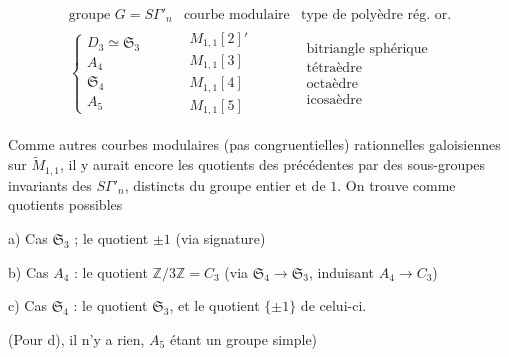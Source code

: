 \[
\begin{array}{lll}
\text{groupe }G=S\Gamma'_n & \text{courbe modulaire} & \text{type de polyèdre rég. or.}\\[.5em]
\left\{\begin{array}{l}D_3\simeq\mathfrak S_3\\ A_4\\ \mathfrak S_4\\ A_5\end{array}\right.
&\begin{array}{l}M_{1,1}[2]'\\M_{1,1}[3]\\M_{1,1}[4]\\M_{1,1}[5]\end{array}
&\begin{array}{l}\text{bitriangle sphérique}\\\text{tétraèdre}\\\text{octaèdre}\\\text{icosaèdre}\end{array}
\end{array}
\tag{75}
\]

Comme autres courbes modulaires (pas congruentielles)
rationnelles galoisiennes sur $\widetilde M_{1,1}$, il y aurait encore
les quotients des précédentes par des sous-groupes
invariants des $S\Gamma'_n$, distincts du groupe entier et de $1$.
On trouve comme quotients possibles

\noindent a) Cas $\mathfrak S_3$ ; le quotient $\pm1$ (via signature)

\noindent b) Cas $A_4$ : le quotient $\mathbb Z/3\mathbb Z=C_3$
(via $\mathfrak S_4\to\mathfrak S_3$, induisant $A_4\to C_3$)

\noindent c) Cas $\mathfrak S_4$ : le quotient $\mathfrak S_3$, et le quotient $\{\pm1\}$ de celui-ci.

(Pour d), il n'y a rien, $A_5$ étant un groupe simple)


